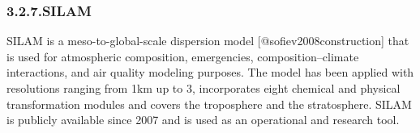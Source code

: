 \documentclass[9pt]{report}
\begin{document}
\begin{table}[h!]%
\begin{mdcenter}%
{}%
\end{mdcenter}\label{mocage-portfolio}%
\end{table}%

\subsubsection{3.2.7.\hspace*{0.5em}SILAM}\label{sec-silam}%

\noindent{}SILAM is a meso-to-global-scale dispersion model [@sofiev2008construction] that is used for atmospheric composition, emergencies, composition–climate interactions, and air quality modeling purposes.
The model has been applied with resolutions ranging from 1km up to 3\textdegree{}, incorporates eight chemical and physical transformation modules and covers the troposphere and the stratosphere.
SILAM is publicly available since 2007 and is used as an operational and research tool.%
\end{document}
